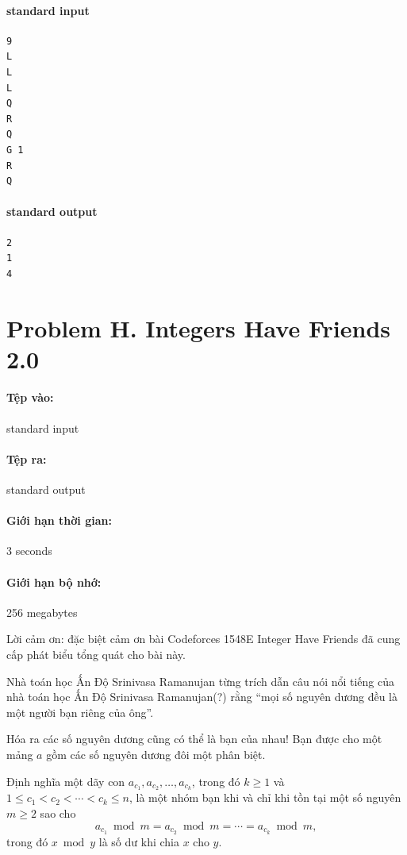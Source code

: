 \documentclass[11pt]{article}
\begin{document}
\paragraph{standard input}
\begin{verbatim}
9
L
L
L
Q
R
Q
G 1
R
Q
\end{verbatim}

\paragraph{standard output}
\begin{verbatim}
2
1
4
\end{verbatim}

\section{Problem H. Integers Have Friends 2.0}

\paragraph{Tệp vào:} standard input
\paragraph{Tệp ra:} standard output
\paragraph{Giới hạn thời gian:} 3 seconds
\paragraph{Giới hạn bộ nhớ:} 256 megabytes

Lời cảm ơn: đặc biệt cảm ơn bài Codeforces 1548E Integer Have Friends đã cung
cấp phát biểu tổng quát cho bài này.

Nhà toán học Ấn Độ Srinivasa Ramanujan từng trích dẫn câu nói nổi tiếng của
nhà toán học Ấn Độ Srinivasa Ramanujan(?) rằng ``mọi số nguyên dương đều là
một người bạn riêng của ông''.

Hóa ra các số nguyên dương cũng có thể là bạn của nhau! Bạn được cho một mảng
\(a\) gồm các số nguyên dương đôi một phân biệt.

Định nghĩa một dãy con \(a_{c_1},a_{c_2},\ldots,a_{c_k}\), trong đó \(k\ge 1\)
và \(1\le c_1<c_2<\cdots<c_k\le n\), là một nhóm bạn khi và chỉ khi tồn tại
một số nguyên \(m\ge 2\) sao cho
\[
  a_{c_1}\bmod m=a_{c_2}\bmod m=\cdots=a_{c_k}\bmod m,
\]
trong đó \(x\bmod y\) là số dư khi chia \(x\) cho \(y\).
\end{document}
